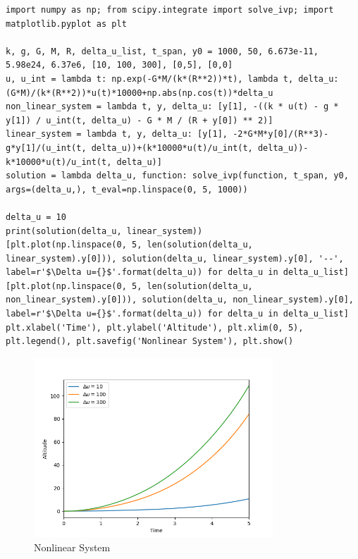 \documentclass{article}
\begin{document}
\begin{lstlisting}
import numpy as np; from scipy.integrate import solve_ivp; import matplotlib.pyplot as plt

k, g, G, M, R, delta_u_list, t_span, y0 = 1000, 50, 6.673e-11, 5.98e24, 6.37e6, [10, 100, 300], [0,5], [0,0]
u, u_int = lambda t: np.exp(-G*M/(k*(R**2))*t), lambda t, delta_u: (G*M)/(k*(R**2))*u(t)*10000+np.abs(np.cos(t))*delta_u
non_linear_system = lambda t, y, delta_u: [y[1], -((k * u(t) - g * y[1]) / u_int(t, delta_u) - G * M / (R + y[0]) ** 2)]
linear_system = lambda t, y, delta_u: [y[1], -2*G*M*y[0]/(R**3)-g*y[1]/(u_int(t, delta_u))+(k*10000*u(t)/u_int(t, delta_u))-k*10000*u(t)/u_int(t, delta_u)]
solution = lambda delta_u, function: solve_ivp(function, t_span, y0, args=(delta_u,), t_eval=np.linspace(0, 5, 1000))
 
delta_u = 10
print(solution(delta_u, linear_system))
[plt.plot(np.linspace(0, 5, len(solution(delta_u, linear_system).y[0])), solution(delta_u, linear_system).y[0], '--', label=r'$\Delta u={}$'.format(delta_u)) for delta_u in delta_u_list]
[plt.plot(np.linspace(0, 5, len(solution(delta_u, non_linear_system).y[0])), solution(delta_u, non_linear_system).y[0], label=r'$\Delta u={}$'.format(delta_u)) for delta_u in delta_u_list]
plt.xlabel('Time'), plt.ylabel('Altitude'), plt.xlim(0, 5), plt.legend(), plt.savefig('Nonlinear System'), plt.show()
\end{lstlisting}
\begin{figure}
    \centering
    \includegraphics[width=0.8\textwidth]{Nonlinear System.png}
    \caption{Nonlinear System}
\end{figure}
\end{document}
